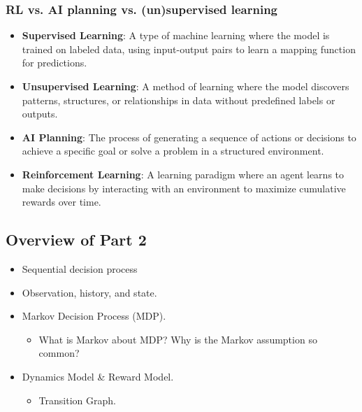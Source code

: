 \subsubsection{RL vs. AI planning vs. (un)supervised learning}
\begin{summary}
    \begin{itemize}
        \item \textbf{Supervised Learning}: A type of machine learning where the model is trained on labeled data, using input-output pairs to learn a mapping function for predictions.
        \item \textbf{Unsupervised Learning}: A method of learning where the model discovers patterns, structures, or relationships in data without predefined labels or outputs.
        \item \textbf{AI Planning}: The process of generating a sequence of actions or decisions to achieve a specific goal or solve a problem in a structured environment.
        \item \textbf{Reinforcement Learning}: A learning paradigm where an agent learns to make decisions by interacting with an environment to maximize cumulative rewards over time.
    \end{itemize}
\end{summary}

\subsection{Overview of Part 2}
\begin{summary}
    \begin{itemize}
        \item Sequential decision process
        \item Observation, history, and state.
        \item Markov Decision Process (MDP).
        \begin{itemize}
            \item What is Markov about MDP? Why is the Markov assumption so common?
        \end{itemize}
        \item Dynamics Model \& Reward Model.
        \begin{itemize}
            \item Transition Graph.
        \end{itemize}
    \end{itemize}
\end{summary}

